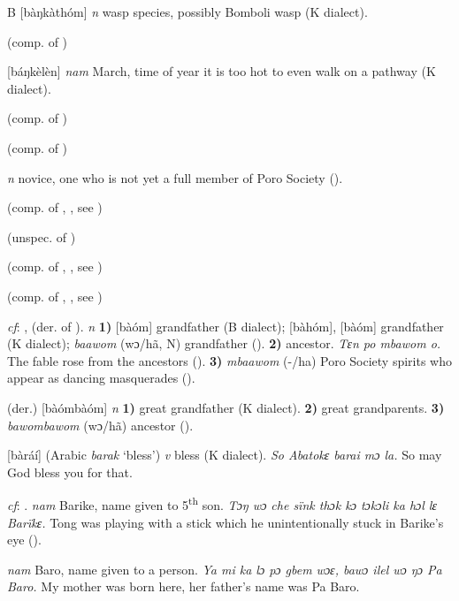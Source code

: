 \begin{letter}{B}
 [bàŋkàthóm] \textit{n} wasp species, possibly Bomboli wasp (K dialect). 

 (comp. of ) 

 [báŋkèlèn] \textit{nam} March, time of year it is too hot to even walk on a pathway (K dialect). 

 (comp. of ) 

 (comp. of ) 

 \textit{n} novice, one who is not yet a full member of Poro Society (\citealt{Pichl1967}). 

 (comp. of , , see ) 

 (unspec. of ) 

 (comp. of , , see ) 

 (comp. of , , see ) 

 \textit{cf}: ,  (der. of ). \textit{n} \textbf{1)} [bàóm] grandfather (B dialect); [bàhóm], [bàóm] grandfather (K dialect); \textit{baawom} (wɔ/hã, N) grandfather (\citealt{Pichl1967}). \textbf{2)} ancestor. \textit{Tɛn po mbawom o.} The fable rose from the ancestors (\citealt{Pichl1967}). \textbf{3)} \textit{mbaawom} (-/ha) Poro Society spirits who appear as dancing masquerades (\citealt{Pichl1967}).

 (der.) [bàómbàóm] \textit{n} \textbf{1)} great grandfather (K dialect). \textbf{2)} great grandparents. \textbf{3)} \textit{bawombawom} (wɔ/hã) ancestor (\citealt{Pichl1967}). 

 [bàráí] (Arabic { } \textit{barak} ‘bless') \textit{v} bless (K dialect). \textit{So Abatokɛ barai mɔ la.} So may God bless you for that.

 \textit{cf}: . \textit{nam} Barike, name given to 5\textsuperscript{th} son. \textit{Tɔŋ wɔ che sïnk thɔk kɔ tɔkɔli ka hɔl lɛ Barïkɛ.} Tong was playing with a stick which he unintentionally stuck in Barike's eye (\citealt{Pichl1967}). 

 \textit{nam} Baro, name given to a person. \textit{Ya mi ka lɔ pɔ gbem wɔɛ, bawɔ ilel wɔ ŋɔ Pa Baro.} My mother was born here, her father's name was Pa Baro.


\end{letter}
